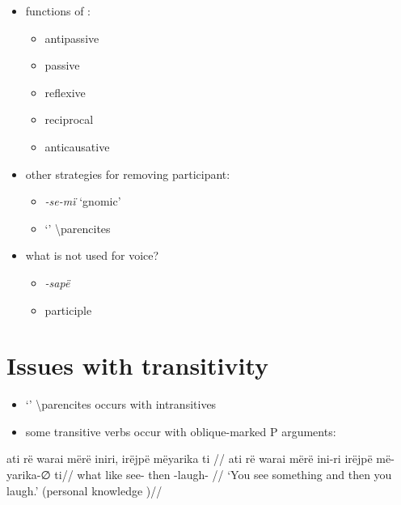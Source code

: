 \documentclass{memoir}
\begin{document}
\begin{itemize}
\tightlist
\item
  functions of :

  \begin{itemize}
  \tightlist
  \item
    antipassive
  \item
    passive
  \item
    reflexive
  \item
    reciprocal
  \item
    anticausative
  \end{itemize}
\item
  other strategies for removing participant:

  \begin{itemize}
  \tightlist
  \item
    \emph{-se-mï} `gnomic'
  \item
     `' \textbackslash parencites
  \end{itemize}
\item
  what is not used for voice?

  \begin{itemize}
  \tightlist
  \item
    \emph{-sapë}
  \item
    participle
  \end{itemize}
\end{itemize}

\section{Issues with transitivity}

\begin{itemize}
\tightlist
\item
   `' \textbackslash parencites occurs with
  intransitives
\item
  some transitive verbs occur with oblique-marked P arguments:
\end{itemize}

\ex \label{convrisamaj-1}
\begingl \glpreamble ati rë warai mërë iniri, irëjpë mëyarika ti //
\gla ati rë warai mërë ini-ri irëjpë më-yarika-∅ ti//
\glb what  like  see- then -laugh- //
\glft ‘You see something and then you laugh.’ (personal knowledge
)//
\endgl
\xe

\printbibliography
\end{document}
